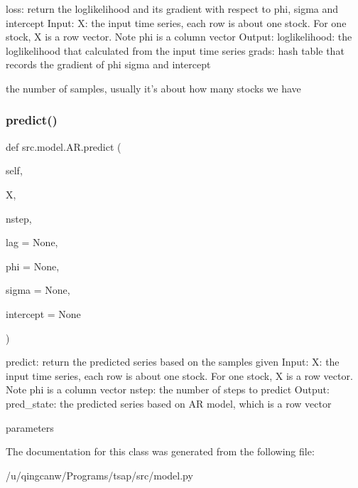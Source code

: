 \begin{DoxyVerb}loss: return the loglikelihood and its gradient with respect to phi, sigma and intercept
   Input: 
 X: the input time series, each row is about one stock. For one stock, X is a row vector. Note phi is a column vector
   Output:
  loglikelihood: the loglikelihood that calculated from the input time series
  grads: hash table that records the gradient of phi sigma and intercept\end{DoxyVerb}
\begin{DoxyVerb}the number of samples, usually it's about how many stocks we have \end{DoxyVerb}
 \mbox{\label{classsrc_1_1model_1_1AR_a2a2f41f1e5cfb10f0c5680ea689e1994}} 
\subsubsection{\texorpdfstring{predict()}{predict()}}
{\footnotesize\ttfamily def src.\+model.\+A\+R.\+predict (\begin{DoxyParamCaption}\item[{}]{self,  }\item[{}]{X,  }\item[{}]{nstep,  }\item[{}]{lag = {\ttfamily None},  }\item[{}]{phi = {\ttfamily None},  }\item[{}]{sigma = {\ttfamily None},  }\item[{}]{intercept = {\ttfamily None} }\end{DoxyParamCaption})}

\begin{DoxyVerb}predict: return the predicted series based on the samples given
   Input: 
 X: the input time series, each row is about one stock. For one stock, X is a row vector. Note phi is a column vector
 nstep: the number of steps to predict
   Output:
  pred_state: the predicted series based on AR model, which is a row vector\end{DoxyVerb}
\begin{DoxyVerb}parameters\end{DoxyVerb}
 

The documentation for this class was generated from the following file\+:\begin{DoxyCompactItemize}
\item 
/u/qingcanw/\+Programs/tsap/src/model.\+py\end{DoxyCompactItemize}
